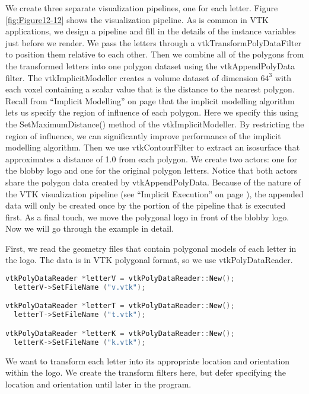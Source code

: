 We create three separate visualization pipelines, one for each letter. Figure \ref{fig:Figure12-12} shows the visualization pipeline. As is common in VTK applications, we design a pipeline and fill in the details of the instance variables just before we render. We pass the letters through a vtkTransformPolyDataFilter to position them relative to each other. Then we combine all of the polygons from the transformed letters into one polygon dataset using the vtkAppendPolyData filter. The vtkImplicitModeller creates a volume dataset of dimension $64^3$ with each voxel containing a scalar value that is the distance to the nearest polygon. Recall from ``Implicit Modelling'' on page \pageref{subsec:implicit_modelling} that the implicit modelling algorithm lets us specify the region of influence of each polygon. Here we specify this using the SetMaximumDistance() method of the vtkImplicitModeller. By restricting the region of influence, we can significantly improve performance of the implicit modelling algorithm. Then we use vtkContourFilter to extract an isosurface that approximates a distance of 1.0 from each polygon. We create two actors: one for the blobby logo and one for the original polygon letters. Notice that both actors share the polygon data created by vtkAppendPolyData. Because of the nature of the VTK visualization pipeline (see ``Implicit Execution'' on page \pageref{subsec:implicit_execution} ), the appended data will only be created once by the portion of the pipeline that is executed first. As a final touch, we move the polygonal logo in front of the blobby logo. Now we will go through the example in detail.

First, we read the geometry files that contain polygonal models of each letter in the logo. The data is in VTK polygonal format, so we use vtkPolyDataReader.

\begin{lstlisting}[language=C++, caption={Reading the polygonal models of each letter.}]
vtkPolyDataReader *letterV = vtkPolyDataReader::New();
  letterV->SetFileName ("v.vtk");

vtkPolyDataReader *letterT = vtkPolyDataReader::New();
  letterT->SetFileName ("t.vtk");

vtkPolyDataReader *letterK = vtkPolyDataReader::New();
  letterK->SetFileName ("k.vtk");
\end{lstlisting}

We want to transform each letter into its appropriate location and orientation within the logo. We create the transform filters here, but defer specifying the location and orientation until later in the program.


